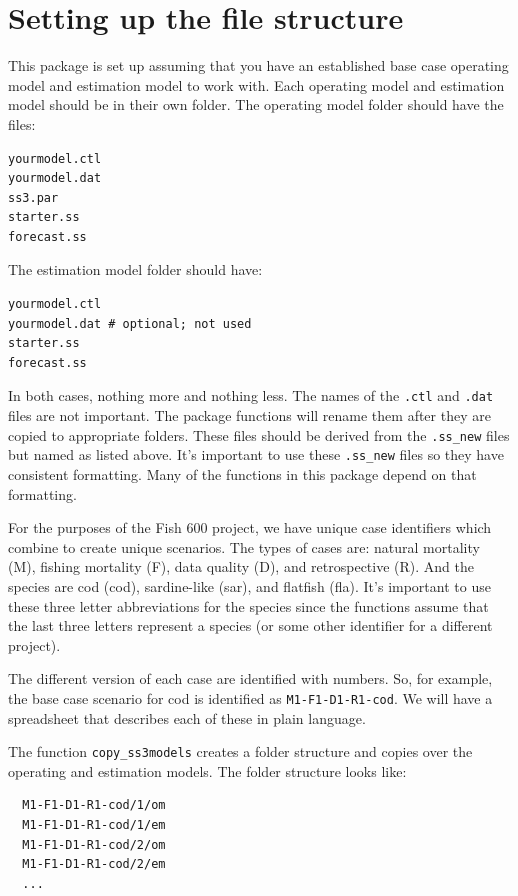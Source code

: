 \documentclass[12pt]{article}
\begin{document}
\section{Setting up the file structure}
This package is set up assuming that you have an established base case 
operating model and estimation model to work with. Each operating model and 
estimation model should be in their own folder. The operating model folder 
should have the files:

\begin{verbatim}
yourmodel.ctl
yourmodel.dat
ss3.par
starter.ss
forecast.ss
\end{verbatim}

\noindent
The estimation model folder should have:

\begin{verbatim}
yourmodel.ctl
yourmodel.dat # optional; not used
starter.ss
forecast.ss
\end{verbatim}

\noindent
In both cases, nothing more and nothing less. The names of the \texttt{.ctl} 
and \texttt{.dat} files are not important. The package functions will rename 
them after they are copied to appropriate folders. These files should be 
derived from the \texttt{.ss\_new} files but named as listed above. It's 
important to use these \texttt{.ss\_new} files so they have consistent 
formatting. Many of the functions in this package depend on that formatting.

For the purposes of the Fish 600 project, we have unique case identifiers which 
combine to create unique scenarios. The types of cases are: natural mortality 
(M), fishing mortality (F), data quality (D), and retrospective (R). And the 
species are cod (cod), sardine-like (sar), and flatfish (fla). It's important 
to use these three letter abbreviations for the species since the functions 
assume that the last three letters represent a species (or some other 
identifier for a different project).

The different version of each case are identified with numbers. So, for 
example, the base case scenario for cod is identified as 
\texttt{M1-F1-D1-R1-cod}. We will have a spreadsheet that describes each of 
these in plain language.

The function \texttt{copy\_ss3models} creates a folder structure and copies 
over the operating and estimation models. The folder structure looks like:

\begin{verbatim}
  M1-F1-D1-R1-cod/1/om
  M1-F1-D1-R1-cod/1/em
  M1-F1-D1-R1-cod/2/om
  M1-F1-D1-R1-cod/2/em
  ...
\end{verbatim}
\end{document}

